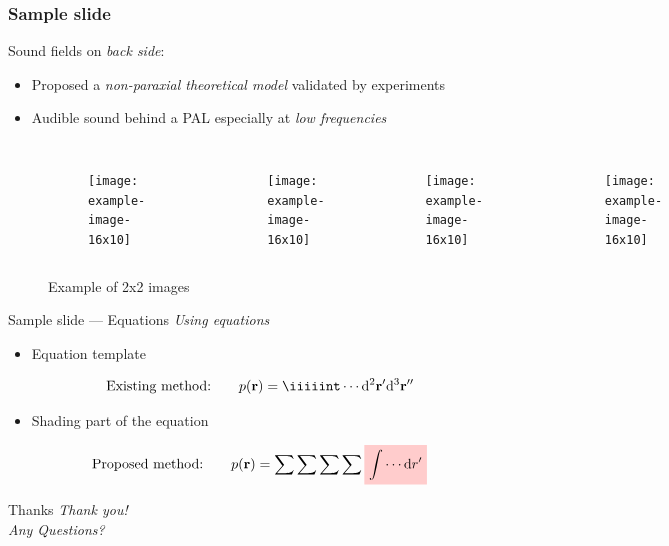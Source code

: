 \documentclass[9pt, mathserif, aspectratio=43]{beamer}
\begin{document}
\begin{frame}
    \frametitle{Sample slide}
    Sound fields on \emph{back side}:
    \begin{itemize}
        \item Proposed a \emph{non-paraxial theoretical model} validated by experiments
    \item Audible sound behind a PAL especially at \emph{low frequencies} 
    \end{itemize}
\begin{figure}[!htb]
    \centering
    \begin{columns}
    \begin{subfigure}{\textwidth}
        \centering
        \texttt{[image: example-image-16x10]}
    \end{subfigure}
    \\
    \begin{subfigure}{\textwidth}
        \centering
        \texttt{[image: example-image-16x10]}
    \end{subfigure}

    \begin{subfigure}{\textwidth}
        \centering
        \texttt{[image: example-image-16x10]}
    \end{subfigure}
    \\
    \begin{subfigure}{\textwidth}
        \centering
        \texttt{[image: example-image-16x10]}
    \end{subfigure}
    \caption{Example of 2x2 images} 
    \end{columns}
\end{figure}
\end{frame}

\begin{frame}{Sample slide --- Equations}
    \emph{Using equations} 
    \begin{itemize}
        \item Equation template
\end{itemize}
    \begin{equation}
        \text{Existing method:}
        \qquad p(\vb{r}) = \iiiiint 
        \cdots
        \dd^2 \vb{r}' \dd^3 \vb{r}''
    \end{equation}
    \begin{itemize}
        \item Shading part of the equation
    \end{itemize}
    \begin{equation}
        \text{Proposed method:}
        \qquad p(\vb{r}) = \sum\sum\sum\sum 
        \tikz[baseline]{
            \node[fill=red!20, anchor=base]{
            $\displaystyle \int  \cdots \dd r'$}
        }
    \end{equation}
\end{frame}

\begin{frame}{Thanks}
    \centering 
    \Huge \emph{Thank you!\\ Any Questions?}
\end{frame}
\end{document}
